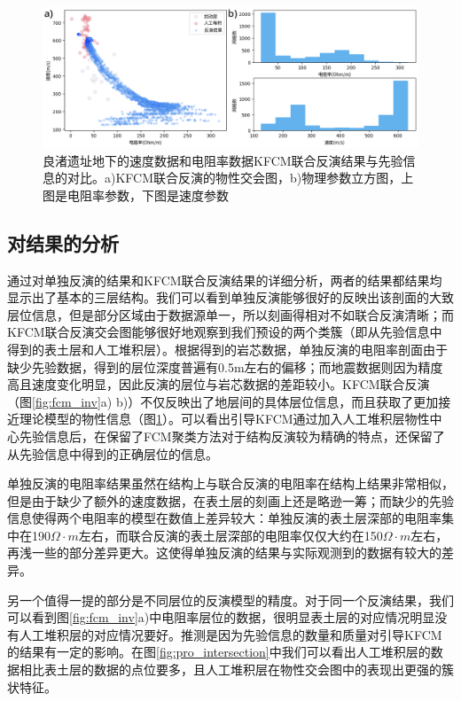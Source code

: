 \begin{figure}[ht]
    \centering
    \includegraphics[width=\textwidth]{figure/thesis/res_predict_hist.png}
    \caption{良渚遗址地下的速度数据和电阻率数据KFCM联合反演结果与先验信息的对比。a)KFCM联合反演的物性交会图，b)物理参数立方图，上图是电阻率参数，下图是速度参数}
    \label{fig:fcm_compare}
\end{figure}

\subsection{对结果的分析}

通过对单独反演的结果和KFCM联合反演结果的详细分析，两者的结果都结果均显示出了基本的三层结构。我们可以看到单独反演能够很好的反映出该剖面的大致层位信息，但是部分区域由于数据源单一，所以刻画得相对不如联合反演清晰；而KFCM联合反演交会图能够很好地观察到我们预设的两个类簇（即从先验信息中得到的表土层和人工堆积层）。根据得到的岩芯数据，单独反演的电阻率剖面由于缺少先验数据，得到的层位深度普遍有0.5m左右的偏移；而地震数据则因为精度高且速度变化明显，因此反演的层位与岩芯数据的差距较小。KFCM联合反演（图\ref{fig:fcm_inv}a) b)）不仅反映出了地层间的具体层位信息，而且获取了更加接近理论模型的物性信息（图\ref{fig:fcm_compare}）。可以看出引导KFCM通过加入人工堆积层物性中心先验信息后，在保留了FCM聚类方法对于结构反演较为精确的特点，还保留了从先验信息中得到的正确层位的信息。

单独反演的电阻率结果虽然在结构上与联合反演的电阻率在结构上结果非常相似，但是由于缺少了额外的速度数据，在表土层的刻画上还是略逊一筹；而缺少的先验信息使得两个电阻率的模型在数值上差异较大：单独反演的表土层深部的电阻率集中在190$\Omega\cdot m$左右，而联合反演的表土层深部的电阻率仅仅大约在150$\Omega\cdot m$左右，再浅一些的部分差异更大。这使得单独反演的结果与实际观测到的数据有较大的差异。

另一个值得一提的部分是不同层位的反演模型的精度。对于同一个反演结果，我们可以看到图\ref{fig:fcm_inv}a)中电阻率层位的数据，很明显表土层的对应情况明显没有人工堆积层的对应情况要好。推测是因为先验信息的数量和质量对引导KFCM的结果有一定的影响。在图\ref{fig:pro_intersection}中我们可以看出人工堆积层的数据相比表土层的数据的点位要多，且人工堆积层在物性交会图中的表现出更强的簇状特征。

